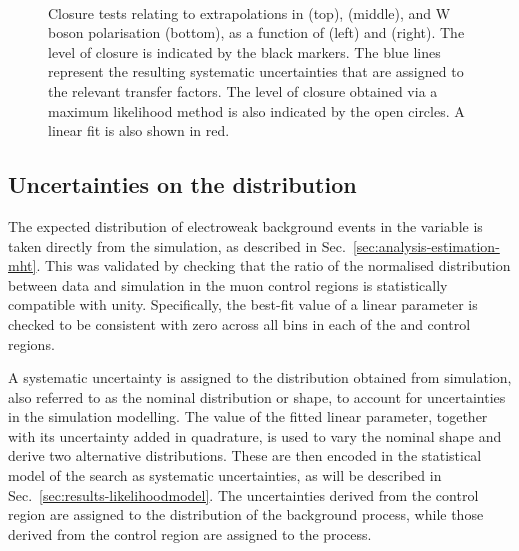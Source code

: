 \begin{figure}[t]
\\
\caption{Closure tests relating to extrapolations in \alphat (top), \bdphi 
(middle), and W boson polarisation (bottom),  as a function of \scalht (left) 
and \njet (right). The level of closure is indicated by the black markers. The 
blue lines represent the resulting systematic uncertainties that are assigned 
to the relevant transfer factors. The level of closure obtained via a maximum 
likelihood method is also indicated by the open circles. A linear fit is also 
shown in red.}
\label{fig:closuretests}
\end{figure}


\subsection{Uncertainties on the \mht distribution}
\label{sec:analysis-systematics-mht}
The expected distribution of electroweak background events in the \mht variable 
is taken directly from the simulation, as described in 
Sec.~\ref{sec:analysis-estimation-mht}. This was validated by checking that the 
ratio of the normalised distribution between data and simulation in the muon 
control 
regions is statistically compatible with unity. Specifically, the best-fit 
value of a linear parameter is checked to be consistent with zero across all 
\njnbht bins in each of the \mj and \mmj control regions.

A systematic uncertainty is assigned to the \mht distribution obtained from 
simulation, also referred to as the  
nominal \mht distribution or shape, to account for uncertainties in the 
simulation modelling. The 
value of the fitted linear parameter, together with its uncertainty added in 
quadrature, is used to vary the nominal \mht shape and derive two alternative 
distributions. These are then encoded in the statistical model of the search as 
\pmonesigma systematic uncertainties, as will be described in 
Sec.~\ref{sec:results-likelihoodmodel}. The uncertainties derived from the \mj 
control region are assigned to the \mht distribution of the \ttw background 
process, while those derived from the \mmj control region are assigned to the 
\znnj process.

